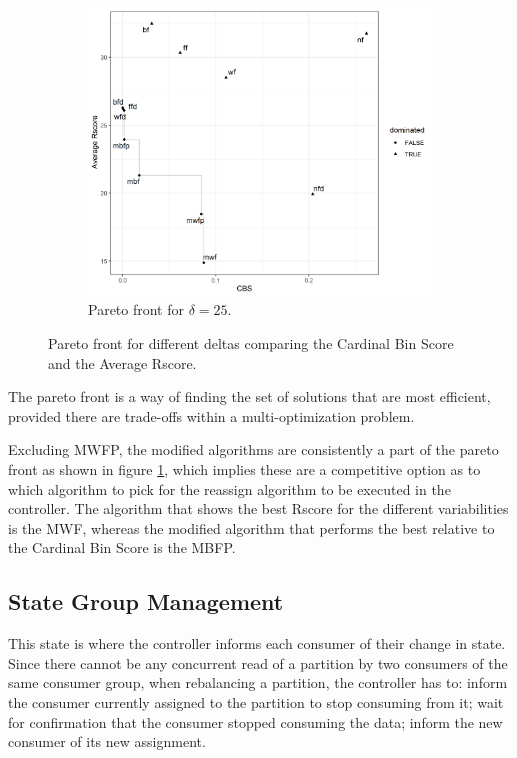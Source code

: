 \begin{figure}[H]
    \begin{subfigure}{0.3\textwidth}
        \includegraphics[width=\textwidth]{images/controller/pareto_front/25.png}
        \caption{Pareto front for $\delta = 25$.}
    \end{subfigure}
    \caption{Pareto front for different deltas comparing the Cardinal Bin Score
    and the Average Rscore.}
    \label{fig:pareto_front} 
\end{figure}

The pareto front is a way of finding the set of solutions that are most
efficient, provided there are trade-offs within a multi-optimization problem.

Excluding MWFP, the modified algorithms are consistently a part of the pareto
front as shown in figure \ref{fig:pareto_front}, which implies these are a
competitive option as to which algorithm to pick for the reassign algorithm to
be executed in the controller. The algorithm that shows the best Rscore for the
different variabilities is the MWF, whereas the modified algorithm that performs
the best relative to the Cardinal Bin Score is the MBFP.

\subsection{State Group Management}
\label{sub:state_group_management}

This state is where the controller informs each consumer of their change in
state. Since there cannot be any concurrent read of a partition by two consumers
of the same consumer group, when rebalancing a partition, the controller has to:
inform the consumer currently assigned to the partition to stop
consuming from it; wait for confirmation that the consumer stopped consuming the
data; inform the new consumer of its new assignment.

